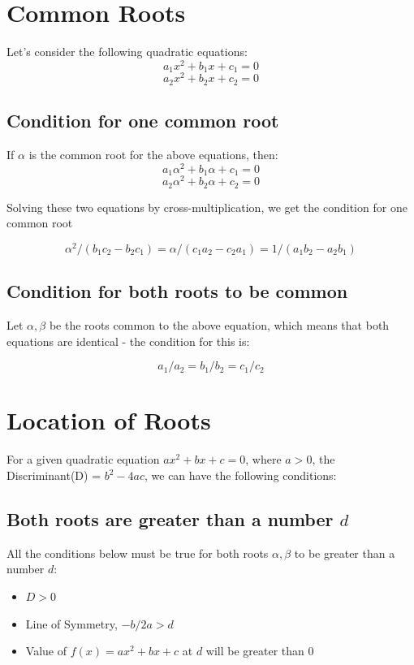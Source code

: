 \documentclass{book}
\begin{document}
	\section{Common Roots}
	Let's consider the following quadratic equations:
	$$a_1x^2 + b_1x + c_1 = 0$$
	$$a_2x^2 + b_2x + c_2 = 0$$
	
	\subsection{Condition for one common root}
	If $\alpha$ is the common root for the above equations, then:
	$$a_1\alpha^2 + b_1\alpha + c_1 = 0$$
	$$a_2\alpha^2 + b_2\alpha + c_2 = 0$$
	
	Solving these two equations by cross-multiplication, we get the condition for one common root
	
	\begin{mdframed}[backgroundcolor=yellow]
		$$\alpha^2 / {(b_1c_2 - b_2c_1)} = \alpha/{(c_1a_2-c_2a_1) = 1/{(a_1b_2 - a_2b_1)}}$$
	\end{mdframed}
	
	\subsection{Condition for both roots to be common}
	Let $\alpha, \beta$ be the roots common to the above equation, which means that both equations are identical - the condition for this is:
	
	\begin{mdframed}[backgroundcolor=yellow]
		$$a_1/a_2 = b_1/b_2 = c_1/c_2$$
	\end{mdframed}
	
	\section{Location of Roots}
	For a given quadratic equation $ax^2 + bx + c = 0$, where $a>0$, the Discriminant(D) = $b^2-4ac$, we can have the following conditions:
	\subsection{Both roots are greater than a number $d$}
	All the conditions below must be true  for both roots $\alpha, \beta$ to be greater than a number $d$:
	\begin{itemize}
		\item $D>0$
		\item Line of Symmetry, $-b/2a > d$
		\item Value of $f(x) = ax^2 + bx + c$ at $d$ will be greater than $0$ 
	\end{itemize}
	
\end{document}
